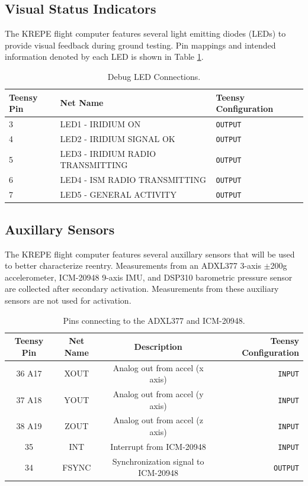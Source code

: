 \documentclass{article}
\begin{document}
\subsection{Visual Status Indicators}
The KREPE flight computer features several light emitting diodes (LEDs) to provide visual feedback during ground testing. Pin mappings and intended information denoted by each LED is shown in Table \ref{tab:pins_leds}.
\begin{table}[H]
	\centering
	\caption{Debug LED Connections.}
	\label{tab:pins_leds}
	\begin{tabular}{l|l|l}
		Teensy Pin & Net Name     & Teensy Configuration \\
		\hline 
		3 & LED1 - IRIDIUM ON        &   \texttt{OUTPUT}\\
		4 & LED2 - IRIDIUM SIGNAL OK       &   \texttt{OUTPUT}\\
		5 & LED3 - IRIDIUM RADIO TRANSMITTING       &   \texttt{OUTPUT}\\
		6 & LED4 - ISM RADIO TRANSMITTING       &   \texttt{OUTPUT}\\
		7 & LED5 - GENERAL ACTIVITY       &   \texttt{OUTPUT}
	\end{tabular}
\end{table}


\subsection{Auxillary Sensors}
The KREPE flight computer features several auxillary sensors that will be used to better characterize reentry. Measurements from an ADXL377 3-axis $\pm$200g accelerometer, ICM-20948 9-axis IMU, and DSP310 barometric pressure sensor are collected after secondary activation. Measurements from these auxiliary sensors are not used for activation.

\begin{table}[H]
    \centering
    \caption{Pins connecting to the ADXL377 and ICM-20948.}
    \label{tab:pins_motionsensor}
    \begin{tabular}{c|c|c|r}
    Teensy Pin & Net Name  & Description   & Teensy Configuration \\
    \hline 
    36 A17 & XOUT & Analog out from accel (x axis) & \texttt{INPUT} \\
    37 A18 & YOUT & Analog out from accel (y axis) & \texttt{INPUT} \\
    38 A19 & ZOUT & Analog out from accel (z axis) & \texttt{INPUT} \\
    35 & INT & Interrupt from ICM-20948 & \texttt{INPUT} \\
    34 & FSYNC & Synchronization signal to ICM-20948 & \texttt{OUTPUT} 
    \end{tabular}
\end{table}
\end{document}
